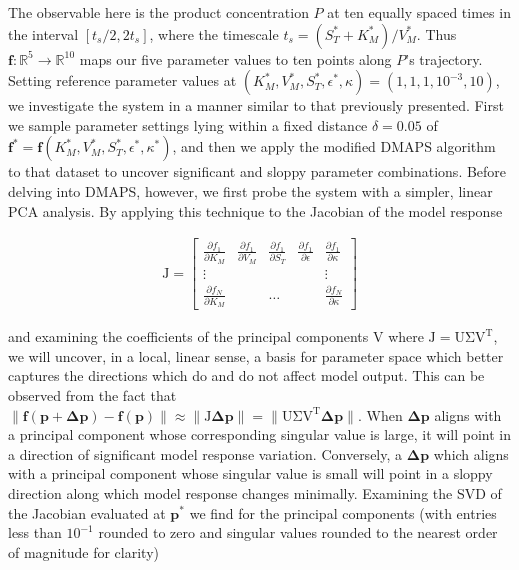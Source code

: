The observable here is the product concentration $P$ at ten equally
spaced times in the interval $[t_s/2,2t_s]$, where the timescale
$t_s = (S_T^* + K_M^*)/V_M^*$. Thus
$\mathbf{f}:\mathbb{R}^5 \rightarrow \mathbb{R}^{10}$ maps our five
parameter values to ten points along $P$'s trajectory. Setting
reference parameter values at
$(K_M^*,V_M^*,S_T^*,\epsilon^*,\kappa) = (1,1,1,10^{-3},10)$, we
investigate the system in a manner similar to that previously
presented.  First we sample parameter settings lying within a fixed
distance $\delta=0.05$ of
$\mathbf{f}^* = \mathbf{f}(K_M^*, V_M^*, S_T^*, \epsilon^*,
\kappa^*)$, and then we apply the modified DMAPS algorithm to that
dataset to uncover significant and sloppy parameter combinations.
Before delving into DMAPS, however, we first probe the system with a
simpler, linear PCA analysis.  By applying this technique to the
Jacobian of the model response

\begin{align}
  \mathrm{J} = \begin{bmatrix} \frac{\partial f_1}{\partial K_M} &
    \frac{\partial f_1}{\partial V_M} & \frac{\partial f_1}{\partial
      S_T} & \frac{\partial f_1}{\partial \epsilon} & \frac{\partial
      f_1}{\partial \kappa} \\ \vdots & & & & \vdots \\ \frac{\partial
      f_N}{\partial K_M} & & \hdots & & \frac{\partial f_N}{\partial
      \kappa} \end{bmatrix}
\end{align}

and examining the coefficients of the principal components
$\mathrm{V}$ where $\mathrm{J} = \mathrm{U \Sigma V^T}$, we will
uncover, in a local, linear sense, a basis for parameter space which
better captures the directions which do and do not affect model
output. This can be observed from the fact that
$\| \mathbf{f(p + \Delta p) - f(p)} \| \approx \| \mathrm{J}
\mathbf{\Delta p} \| = \| \mathrm{U \Sigma V^T} \mathbf{\Delta p}
\|$. When $\mathbf{\Delta p}$ aligns with a principal component whose
corresponding singular value is large, it will point in a direction of
significant model response variation. Conversely, a
$\mathbf{\Delta p}$ which aligns with a principal component whose
singular value is small will point in a sloppy direction along which
model response changes minimally. Examining the SVD of the Jacobian
evaluated at $\mathbf{p}^*$ we find for the principal components (with
entries less than $10^{-1}$ rounded to zero and singular values
rounded to the nearest order of magnitude for clarity)

